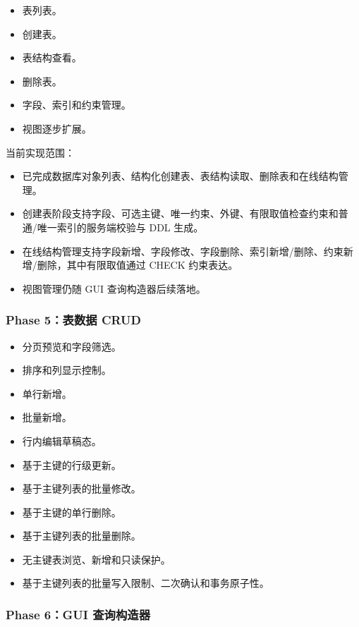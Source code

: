 \documentclass[
  a4paper,
  UTF8]{ctexart}
\providecommand{\tightlist}{%
  \setlength{\itemsep}{0pt}\setlength{\parskip}{0pt}}
\begin{document}
\begin{itemize}
\tightlist
\item
  表列表。
\item
  创建表。
\item
  表结构查看。
\item
  删除表。
\item
  字段、索引和约束管理。
\item
  视图逐步扩展。
\end{itemize}

当前实现范围：

\begin{itemize}
\tightlist
\item
  已完成数据库对象列表、结构化创建表、表结构读取、删除表和在线结构管理。
\item
  创建表阶段支持字段、可选主键、唯一约束、外键、有限取值检查约束和普通/唯一索引的服务端校验与
  DDL 生成。
\item
  在线结构管理支持字段新增、字段修改、字段删除、索引新增/删除、约束新增/删除，其中有限取值通过
  CHECK 约束表达。
\item
  视图管理仍随 GUI 查询构造器后续落地。
\end{itemize}

\hypertarget{phase-5ux8868ux6570ux636e-crud}{%
\subsubsection{Phase 5：表数据
CRUD}\label{phase-5ux8868ux6570ux636e-crud}}

\begin{itemize}
\tightlist
\item
  分页预览和字段筛选。
\item
  排序和列显示控制。
\item
  单行新增。
\item
  批量新增。
\item
  行内编辑草稿态。
\item
  基于主键的行级更新。
\item
  基于主键列表的批量修改。
\item
  基于主键的单行删除。
\item
  基于主键列表的批量删除。
\item
  无主键表浏览、新增和只读保护。
\item
  基于主键列表的批量写入限制、二次确认和事务原子性。
\end{itemize}

\hypertarget{phase-6gui-ux67e5ux8be2ux6784ux9020ux5668}{%
\subsubsection{Phase 6：GUI
查询构造器}\label{phase-6gui-ux67e5ux8be2ux6784ux9020ux5668}}
\end{document}

